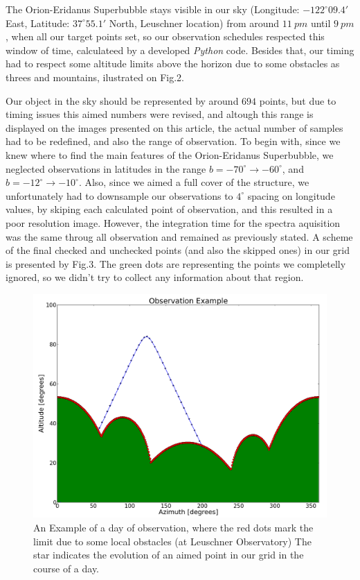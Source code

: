 \documentclass{article}
\begin{document}
The Orion-Eridanus Superbubble stays visible in our sky (Longitude: $-122^{\circ} 09.4'$ East,
Latitude: $37^{\circ} 55.1'$ North, Leuschner location) from around $11 \ pm$ until $9 \ pm$, when
all our target points set, so our observation schedules respected this window of time, calculateed
by a developed \emph{Python} code. Besides that, our timing had to respect some altitude limits 
above the horizon due to some obstacles as threes and mountains, ilustrated on Fig.2.

Our object in the sky should  be represented by around $694$ points,
but due to timing issues this aimed numbers were revised, and altough this range is displayed
on the images presented on this article, the actual number of samples had to be redefined, and
also the range of observation. To begin with, since we knew where to find the main features of 
the Orion-Eridanus Superbubble, we neglected observations in latitudes in the range $b = -70^{\circ}
\rightarrow -60^{\circ}$, and $b = -12^{\circ} \rightarrow -10^{\circ}$. Also, since we aimed a full cover of 
the structure, we unfortunately had to downsample our observations to $4 ^{\circ}$ spacing on longitude 
values, by skiping each calculated point of observation, and this resulted in a poor resolution image. 
However, the integration time for the spectra aquisition was the same throug all observation and 
remained as previously stated. A scheme of the final checked and unchecked points (and also the skipped ones) 
in our grid is presented by Fig.3. The green dots are representing the points we 
completelly ignored, so we didn't try to collect any information about that region.

\begin{figure}[H]
\center
\includegraphics[scale=0.32]{mount.png}
\caption {An Example of a day of observation, where the red dots mark the limit due to some local obstacles
(at Leuschner Observatory) The star indicates the evolution of an aimed point in our grid in the course
of a day.} 
\label{mountain}
\end{figure}
\end{document}
